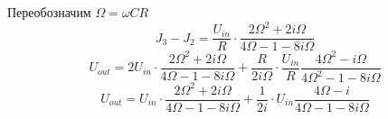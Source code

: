 Переобозначим $\Omega=\omega CR$
\begin{equation}
	J_3-J_2=\frac{U_{in}}{R}\cdot\frac{2\Omega^2 +2i\Omega }{4\Omega-1-8i\Omega}
\end{equation}
\begin{equation}
	U_{out}=2U_{in}
		\cdot\frac{2\Omega^2+2i\Omega}
								{4\Omega-1-8i\Omega}+
			\frac{R}{2i\Omega}\cdot \frac
			{U_{in}}{R}\frac{4\Omega^2-i\Omega}
								{4\Omega^2-1-8i\Omega}
	\end{equation}
	\begin{equation}
	U_{out}=
		U_{in}\cdot\frac{2\Omega^2+2i\Omega}
								{4\Omega-1-8i\Omega}+
		\frac{1}{2i}\cdot 
		U_{in}\frac{4\Omega-i}
								{4\Omega-1-8i\Omega}		
	\end{equation}

